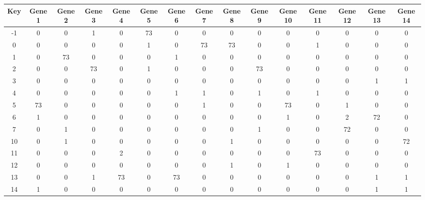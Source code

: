 \begin{tabular}{|c|c|c|c|c|c|c|c|c|c|c|c|c|c|c|}
\hline
Key & Gene 1 & Gene 2 & Gene 3 & Gene 4 & Gene 5 & Gene 6 & Gene 7 & Gene 8 & Gene 9 & Gene 10 & Gene 11 & Gene 12 & Gene 13 & Gene 14 \\
\hline
-1 & 0 & 0 & 1 & 0 & 73 & 0 & 0 & 0 & 0 & 0 & 0 & 0 & 0 & 0 \\
0 & 0 & 0 & 0 & 0 & 1 & 0 & 73 & 73 & 0 & 0 & 1 & 0 & 0 & 0 \\
1 & 0 & 73 & 0 & 0 & 0 & 1 & 0 & 0 & 0 & 0 & 0 & 0 & 0 & 0 \\
2 & 0 & 0 & 73 & 0 & 1 & 0 & 0 & 0 & 73 & 0 & 0 & 0 & 0 & 0 \\
3 & 0 & 0 & 0 & 0 & 0 & 0 & 0 & 0 & 0 & 0 & 0 & 0 & 1 & 1 \\
4 & 0 & 0 & 0 & 0 & 0 & 1 & 1 & 0 & 1 & 0 & 1 & 0 & 0 & 0 \\
5 & 73 & 0 & 0 & 0 & 0 & 0 & 1 & 0 & 0 & 73 & 0 & 1 & 0 & 0 \\
6 & 1 & 0 & 0 & 0 & 0 & 0 & 0 & 0 & 0 & 1 & 0 & 2 & 72 & 0 \\
7 & 0 & 1 & 0 & 0 & 0 & 0 & 0 & 0 & 1 & 0 & 0 & 72 & 0 & 0 \\
10 & 0 & 1 & 0 & 0 & 0 & 0 & 0 & 1 & 0 & 0 & 0 & 0 & 0 & 72 \\
11 & 0 & 0 & 0 & 2 & 0 & 0 & 0 & 0 & 0 & 0 & 73 & 0 & 0 & 0 \\
12 & 0 & 0 & 0 & 0 & 0 & 0 & 0 & 1 & 0 & 1 & 0 & 0 & 0 & 0 \\
13 & 0 & 0 & 1 & 73 & 0 & 73 & 0 & 0 & 0 & 0 & 0 & 0 & 1 & 1 \\
14 & 1 & 0 & 0 & 0 & 0 & 0 & 0 & 0 & 0 & 0 & 0 & 0 & 1 & 1 \\
\hline
\end{tabular}